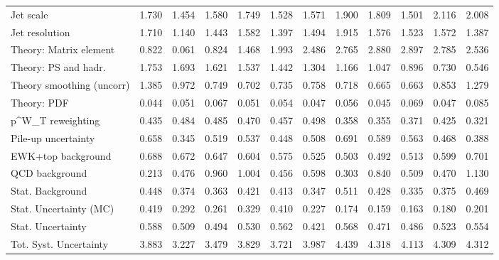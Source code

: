 \begin{tabular}{l|p{0.6cm}p{0.6cm}p{0.6cm}p{0.6cm}p{0.6cm}p{0.6cm}p{0.6cm}p{0.6cm}p{0.6cm}p{0.6cm}p{0.6cm}}
Jet scale                                & 1.730 & 1.454 & 1.580 & 1.749 & 1.528 & 1.571 & 1.900 & 1.809 & 1.501 & 2.116 & 2.008 \\
Jet resolution                           & 1.710 & 1.140 & 1.443 & 1.582 & 1.397 & 1.494 & 1.915 & 1.576 & 1.523 & 1.572 & 1.387 \\
Theory: Matrix element                   & 0.822 & 0.061 & 0.824 & 1.468 & 1.993 & 2.486 & 2.765 & 2.880 & 2.897 & 2.785 & 2.536 \\
Theory: PS and hadr.                     & 1.753 & 1.693 & 1.621 & 1.537 & 1.442 & 1.304 & 1.166 & 1.047 & 0.896 & 0.730 & 0.546 \\
Theory smoothing (uncorr)                & 1.385 & 0.972 & 0.749 & 0.702 & 0.735 & 0.758 & 0.718 & 0.665 & 0.663 & 0.853 & 1.279 \\
Theory: PDF                              & 0.044 & 0.051 & 0.067 & 0.051 & 0.054 & 0.047 & 0.056 & 0.045 & 0.069 & 0.047 & 0.085 \\
p^{W}_{T} reweighting                    & 0.435 & 0.484 & 0.485 & 0.470 & 0.457 & 0.498 & 0.358 & 0.355 & 0.371 & 0.425 & 0.321 \\
Pile-up uncertainty                      & 0.658 & 0.345 & 0.519 & 0.537 & 0.448 & 0.508 & 0.691 & 0.589 & 0.563 & 0.468 & 0.388 \\
EWK+top background                       & 0.688 & 0.672 & 0.647 & 0.604 & 0.575 & 0.525 & 0.503 & 0.492 & 0.513 & 0.599 & 0.701 \\
QCD background                           & 0.213 & 0.476 & 0.960 & 1.004 & 0.456 & 0.598 & 0.303 & 0.840 & 0.509 & 0.470 & 1.130 \\
Stat. Background                         & 0.448 & 0.374 & 0.363 & 0.421 & 0.413 & 0.347 & 0.511 & 0.428 & 0.335 & 0.375 & 0.469 \\
Stat. Uncertainty (MC)                   & 0.419 & 0.292 & 0.261 & 0.329 & 0.410 & 0.227 & 0.174 & 0.159 & 0.163 & 0.180 & 0.201 \\
\hline
Stat. Uncertainty                        & 0.588 & 0.509 & 0.494 & 0.530 & 0.562 & 0.421 & 0.568 & 0.471 & 0.486 & 0.523 & 0.554 \\
\hline
Tot. Syst. Uncertainty                   & 3.883 & 3.227 & 3.479 & 3.829 & 3.721 & 3.987 & 4.439 & 4.318 & 4.113 & 4.309 & 4.312 \\
\hline
\end{tabular}
